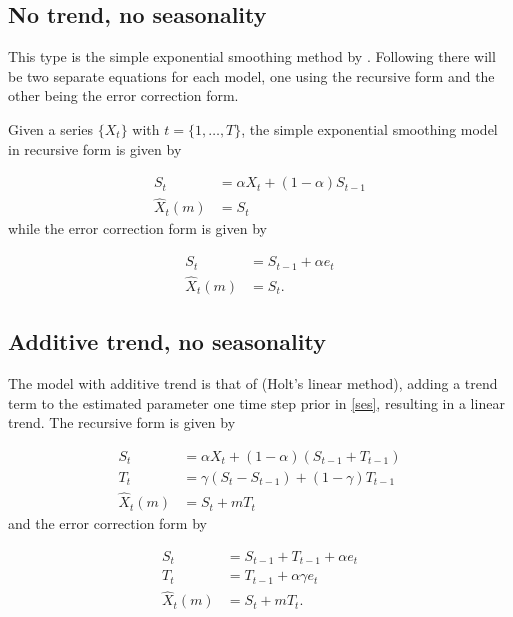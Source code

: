 \subsection*{No trend, no seasonality}

This type is the simple exponential smoothing method by \citet{brown1962smoothing}. Following \citet{gardner2006exponential} there will be two separate equations for each model, one using the recursive form and the other being the error correction form.

Given a series $\{X_t\}$ with $t = \{1,\dots,T\}$, the simple exponential smoothing model in recursive form is given by

\begin{equation}
	\label{ses}
	\begin{array}{rl}
		S_{t}&=\alpha X_{t}+(1-\alpha) S_{t-1} \\
		\hat{X}_{t}(m)&=S_{t}
	\end{array}
\end{equation}
%
while the error correction form is given by

\begin{equation}
	\begin{array}{rl}
		S_{t}&=S_{t-1}+\alpha e_{t} \\
		\hat{X}_{t}(m)&=S_{t}.
	\end{array}
\end{equation}

\subsection*{Additive trend, no seasonality}

The model with additive trend is that of \citet{holt1957forecasting} (Holt's linear method), adding a trend term to the estimated parameter one time step prior in \ref{ses}, resulting in a linear trend. The recursive form is given by

\begin{equation}
	\label{holt}
	\begin{array}{rl}
		S_{t}&=\alpha X_{t}+(1-\alpha)\left(S_{t-1}+T_{t-1}\right) \\
		T_{t}&=\gamma\left(S_{t}-S_{t-1}\right)+(1-\gamma) T_{t-1} \\
		\hat{X}_{t}(m)&=S_{t}+m T_{t}
	\end{array}
\end{equation}
%
and the error correction form by

\begin{equation}
	\begin{array}{rl}
		S_{t}&=S_{t-1}+T_{t-1}+\alpha e_{t} \\
		T_{t}&=T_{t-1}+\alpha \gamma e_{t} \\
		\hat{X}_{t}(m)&=S_{t}+m T_{t}.
	\end{array}
\end{equation}


